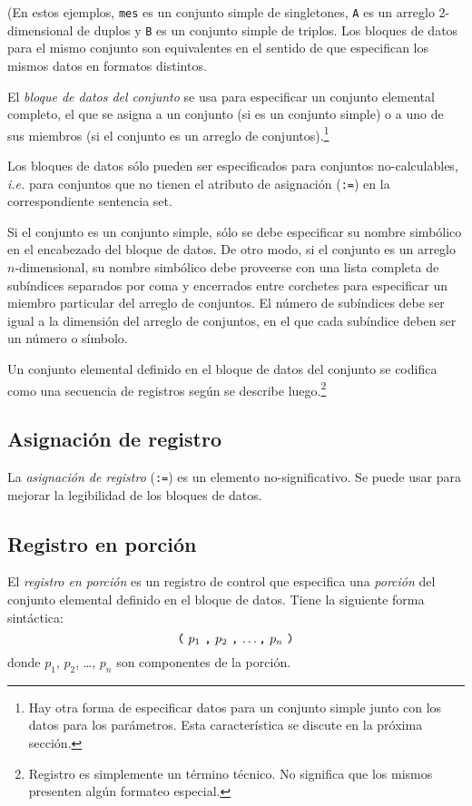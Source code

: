 \documentclass[11pt,spanish]{report}
\begin{document}
\noindent(En estos ejemplos, {\tt mes} es un conjunto simple de singletones, {\tt A} es un arreglo 2-dimensional de duplos y {\tt B} es un conjunto simple de triplos. Los bloques de datos para el mismo conjunto son equivalentes en el sentido de que especifican los mismos datos en formatos distintos.

El {\it bloque de datos del conjunto} se usa para especificar un conjunto elemental completo, el que se asigna a un conjunto (si es un conjunto simple) o a uno de sus miembros (si el conjunto es un arreglo de conjuntos).\footnote{Hay otra forma de especificar datos para un conjunto simple junto con los datos para los parámetros. Esta característica se discute en la próxima sección.}

Los bloques de datos sólo pueden ser especificados para conjuntos no-calculables, {\it i.e.} para conjuntos que no tienen el atributo de asignación ({\tt:=}) en la correspondiente sentencia set.

Si el conjunto es un conjunto simple, sólo se debe especificar su nombre simbólico en el encabezado del bloque de datos. De otro modo, si el conjunto es un arreglo $n$-dimensional, su nombre simbólico debe proveerse con una lista completa de subíndices separados por coma y encerrados entre corchetes para especificar un miembro particular del arreglo de conjuntos. El número de subíndices debe ser igual a la dimensión del arreglo de conjuntos, en el que cada subíndice deben ser un número o símbolo.

Un conjunto elemental definido en el bloque de datos del conjunto se codifica como una secuencia de registros según se describe luego.\footnote{{Registro} es simplemente un término técnico. No significa que los mismos presenten algún formateo especial.}

\subsection{Asignación de registro}

La {\it asignación de registro} ({\tt:=}) es un elemento no-significativo. Se puede usar para mejorar la legibilidad de los bloques de datos.

\subsection{Registro en porción}

El {\it registro en porción} es un registro de control que especifica una {\it porción} del conjunto elemental definido en el bloque de datos. Tiene la siguiente forma sintáctica:
$$\mbox{{\tt(} $p_1$ {\tt,} $p_2$ {\tt,} \dots {\tt,} $p_n$ {\tt)}}$$
donde $p_1$, $p_2$, \dots, $p_n$ son componentes de la porción.
\end{document}

